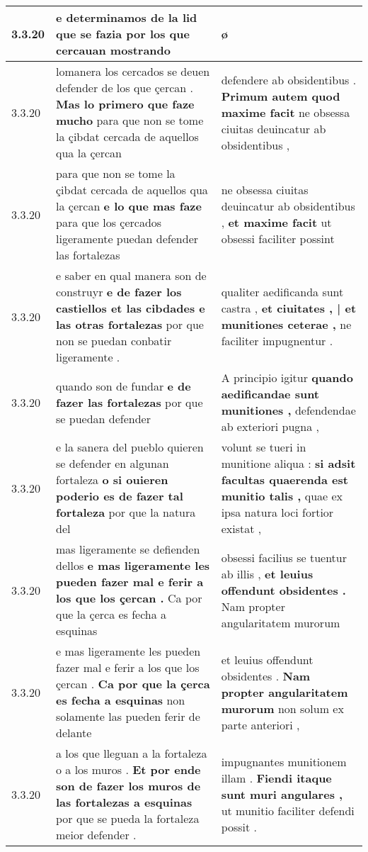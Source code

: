 \begin{tabular}{|p{1cm}|p{6.5cm}|p{6.5cm}|}
3.3.20 & e determinamos de la lid \textbf{ que se fazia } por los que cercauan mostrando & ø \\\hline
3.3.20 & lomanera los cercados se deuen defender de los que çercan . \textbf{ Mas lo primero que faze mucho } para que non se tome la çibdat cercada de aquellos qua la çercan & defendere ab obsidentibus . \textbf{ Primum autem quod maxime facit } ne obsessa ciuitas deuincatur ab obsidentibus , \\\hline
3.3.20 & para que non se tome la çibdat cercada de aquellos qua la çercan \textbf{ e lo que mas faze } para que los çercados ligeramente puedan defender las fortalezas & ne obsessa ciuitas deuincatur ab obsidentibus , \textbf{ et maxime facit } ut obsessi faciliter possint \\\hline
3.3.20 & e saber en qual manera son de construyr \textbf{ e de fazer los castiellos et las cibdades e las otras fortalezas } por que non se puedan conbatir ligeramente . & qualiter aedificanda sunt castra , \textbf{ et ciuitates , | et munitiones ceterae , } ne faciliter impugnentur . \\\hline
3.3.20 & quando son de fundar \textbf{ e de fazer las fortalezas } por que se puedan defender & A principio igitur \textbf{ quando aedificandae sunt munitiones , } defendendae ab exteriori pugna , \\\hline
3.3.20 & e la sanera del pueblo quieren se defender en algunan fortaleza \textbf{ o si ouieren poderio es de fazer tal fortaleza } por que la natura del & volunt se tueri in munitione aliqua : \textbf{ si adsit facultas quaerenda est munitio talis , } quae ex ipsa natura loci fortior existat , \\\hline
3.3.20 & mas ligeramente se defienden dellos \textbf{ e mas ligeramente les pueden fazer mal e ferir a los que los çercan . } Ca por que la çerca es fecha a esquinas & obsessi facilius se tuentur ab illis , \textbf{ et leuius offendunt obsidentes . } Nam propter angularitatem murorum \\\hline
3.3.20 & e mas ligeramente les pueden fazer mal e ferir a los que los çercan . \textbf{ Ca por que la çerca es fecha a esquinas } non solamente las pueden ferir de delante & et leuius offendunt obsidentes . \textbf{ Nam propter angularitatem murorum } non solum ex parte anteriori , \\\hline
3.3.20 & a los que lleguan a la fortaleza o a los muros . \textbf{ Et por ende son de fazer los muros de las fortalezas a esquinas } por que se pueda la fortaleza meior defender . & impugnantes munitionem illam . \textbf{ Fiendi itaque sunt muri angulares , } ut munitio faciliter defendi possit . \\\hline

\end{tabular}
